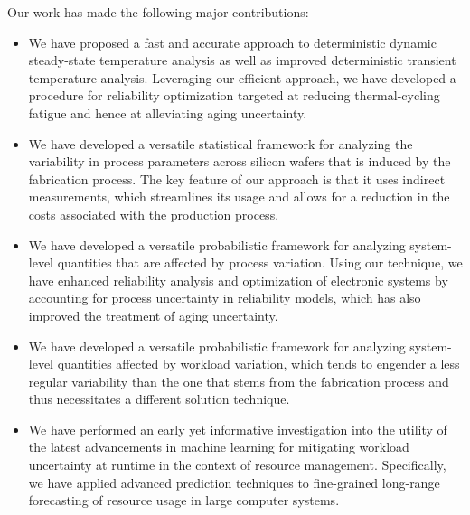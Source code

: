 Our work has made the following major contributions:

\begin{itemize}

\item
We have proposed a fast and accurate approach to deterministic dynamic
steady-state temperature analysis as well as improved deterministic transient
temperature analysis. Leveraging our efficient approach, we have developed a
procedure for reliability optimization targeted at reducing thermal-cycling
fatigue and hence at alleviating aging uncertainty.

\item
We have developed a versatile statistical framework for analyzing the
variability in process parameters across silicon wafers that is induced by the
fabrication process. The key feature of our approach is that it uses indirect
measurements, which streamlines its usage and allows for a reduction in the
costs associated with the production process.

\item
We have developed a versatile probabilistic framework for analyzing system-level
quantities that are affected by process variation. Using our technique, we have
enhanced reliability analysis and optimization of electronic systems by
accounting for process uncertainty in reliability models, which has also
improved the treatment of aging uncertainty.

\item
We have developed a versatile probabilistic framework for analyzing system-level
quantities affected by workload variation, which tends to engender a less
regular variability than the one that stems from the fabrication process and
thus necessitates a different solution technique.

\item
We have performed an early yet informative investigation into the utility of the
latest advancements in machine learning for mitigating workload uncertainty at
runtime in the context of resource management. Specifically, we have applied
advanced prediction techniques to fine-grained long-range forecasting of
resource usage in large computer systems.

\end{itemize}
